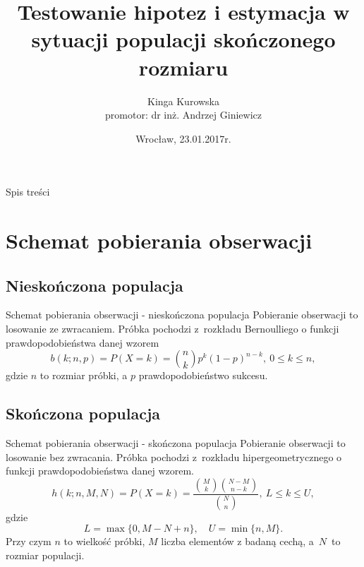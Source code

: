 \documentclass{beamer}
\title[Testowanie hipotez i estymacja w...]{Testowanie hipotez i estymacja w sytuacji populacji skończonego rozmiaru}
\author[Kinga Kurowska]{Kinga Kurowska \\ promotor:  dr inż. Andrzej Giniewicz}
\date[Wrocław 23.01.2017r.]{Wrocław, 23.01.2017r.}
\institute[PWr]{Wydział Matematyki \\ Politechnika Wrocławska}
\newcommand{\1}[1]{\mathds{1}\left(#1\right)}
\begin{document}
	
\frame{\titlepage}

\begin{frame}{Spis treści}
\tableofcontents
\end{frame}


\section{Schemat pobierania obserwacji}
\subsection{Nieskończona populacja}
\begin{frame}{Schemat pobierania obserwacji - nieskończona populacja}
Pobieranie obserwacji to losowanie ze zwracaniem. Próbka pochodzi z~rozkładu Bernoulliego o funkcji prawdopodobieństwa danej wzorem
\begin{equation}
b(k;n,p) = P(X=k) = \binom{n}{k} p^k (1-p)^{n-k},\ 0\leq k\leq n,
\end{equation}
gdzie $n$ to rozmiar próbki, a $p$ prawdopodobieństwo sukcesu. 
\end{frame}

\subsection{Skończona populacja}
\begin{frame}{Schemat pobierania obserwacji - skończona populacja}
Pobieranie obserwacji to losowanie bez zwracania. Próbka pochodzi z~rozkładu hipergeometrycznego o funkcji prawdopodobieństwa danej wzorem.
\begin{equation}
\label{hg}
h(k;n,M,N) = P(X=k) = \frac{\binom{M}{k} \binom{N-M}{n-k}}{\binom{N}{n}},\ L\leq k\leq U,
\end{equation}
gdzie
\begin{equation}
\label{ograniczenia}
L=\max\{0,M-N+n\},\quad U=\min\{n,M\}.
\end{equation}
Przy czym $n$ to wielkość próbki, $M$ liczba elementów z badaną cechą, a~$N$~to rozmiar populacji.
\end{frame}
\end{document}
